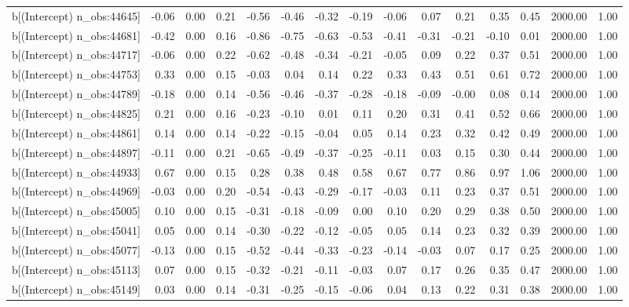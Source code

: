 \begin{table}[ht]
\begin{tabular}{rrrrrrrrrrrrrrr}
  b[(Intercept) n\_obs:44645] & -0.06 & 0.00 & 0.21 & -0.56 & -0.46 & -0.32 & -0.19 & -0.06 & 0.07 & 0.21 & 0.35 & 0.45 & 2000.00 & 1.00 \\ 
  b[(Intercept) n\_obs:44681] & -0.42 & 0.00 & 0.16 & -0.86 & -0.75 & -0.63 & -0.53 & -0.41 & -0.31 & -0.21 & -0.10 & 0.01 & 2000.00 & 1.00 \\ 
  b[(Intercept) n\_obs:44717] & -0.06 & 0.00 & 0.22 & -0.62 & -0.48 & -0.34 & -0.21 & -0.05 & 0.09 & 0.22 & 0.37 & 0.51 & 2000.00 & 1.00 \\ 
  b[(Intercept) n\_obs:44753] & 0.33 & 0.00 & 0.15 & -0.03 & 0.04 & 0.14 & 0.22 & 0.33 & 0.43 & 0.51 & 0.61 & 0.72 & 2000.00 & 1.00 \\ 
  b[(Intercept) n\_obs:44789] & -0.18 & 0.00 & 0.14 & -0.56 & -0.46 & -0.37 & -0.28 & -0.18 & -0.09 & -0.00 & 0.08 & 0.14 & 2000.00 & 1.00 \\ 
  b[(Intercept) n\_obs:44825] & 0.21 & 0.00 & 0.16 & -0.23 & -0.10 & 0.01 & 0.11 & 0.20 & 0.31 & 0.41 & 0.52 & 0.66 & 2000.00 & 1.00 \\ 
  b[(Intercept) n\_obs:44861] & 0.14 & 0.00 & 0.14 & -0.22 & -0.15 & -0.04 & 0.05 & 0.14 & 0.23 & 0.32 & 0.42 & 0.49 & 2000.00 & 1.00 \\ 
  b[(Intercept) n\_obs:44897] & -0.11 & 0.00 & 0.21 & -0.65 & -0.49 & -0.37 & -0.25 & -0.11 & 0.03 & 0.15 & 0.30 & 0.44 & 2000.00 & 1.00 \\ 
  b[(Intercept) n\_obs:44933] & 0.67 & 0.00 & 0.15 & 0.28 & 0.38 & 0.48 & 0.58 & 0.67 & 0.77 & 0.86 & 0.97 & 1.06 & 2000.00 & 1.00 \\ 
  b[(Intercept) n\_obs:44969] & -0.03 & 0.00 & 0.20 & -0.54 & -0.43 & -0.29 & -0.17 & -0.03 & 0.11 & 0.23 & 0.37 & 0.51 & 2000.00 & 1.00 \\ 
  b[(Intercept) n\_obs:45005] & 0.10 & 0.00 & 0.15 & -0.31 & -0.18 & -0.09 & 0.00 & 0.10 & 0.20 & 0.29 & 0.38 & 0.50 & 2000.00 & 1.00 \\ 
  b[(Intercept) n\_obs:45041] & 0.05 & 0.00 & 0.14 & -0.30 & -0.22 & -0.12 & -0.05 & 0.05 & 0.14 & 0.23 & 0.32 & 0.39 & 2000.00 & 1.00 \\ 
  b[(Intercept) n\_obs:45077] & -0.13 & 0.00 & 0.15 & -0.52 & -0.44 & -0.33 & -0.23 & -0.14 & -0.03 & 0.07 & 0.17 & 0.25 & 2000.00 & 1.00 \\ 
  b[(Intercept) n\_obs:45113] & 0.07 & 0.00 & 0.15 & -0.32 & -0.21 & -0.11 & -0.03 & 0.07 & 0.17 & 0.26 & 0.35 & 0.47 & 2000.00 & 1.00 \\ 
  b[(Intercept) n\_obs:45149] & 0.03 & 0.00 & 0.14 & -0.31 & -0.25 & -0.15 & -0.06 & 0.04 & 0.13 & 0.22 & 0.31 & 0.38 & 2000.00 & 1.00 \\ 

\end{tabular}
\end{table}
